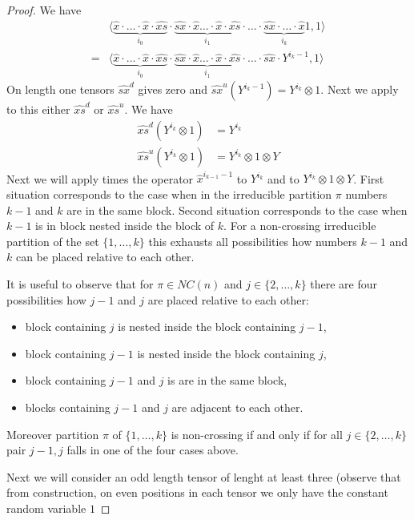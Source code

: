 \documentclass{amsart}
\begin{document}
\begin{proof}
We have
\begin{align*}
	&\langle\underbrace{\widehat{x}\cdot\ldots\cdot \widehat{x} \cdot \widehat{xs}}_{i_0} \cdot \underbrace{\widehat{sx}\cdot \widehat{x}\ldots\cdot \widehat{x} \cdot \widehat{xs}}_{i_1}\cdot\ldots\cdot \underbrace{\widehat{sx}\cdot\ldots\cdot \widehat{x} }_{i_k} 1,1\rangle\\
	=&\langle\underbrace{\widehat{x}\cdot\ldots\cdot \widehat{x} \cdot \widehat{xs}}_{i_0} \cdot \underbrace{\widehat{sx}\cdot \widehat{x}\ldots\cdot \widehat{x} \cdot \widehat{xs}}_{i_1}\cdot\ldots\cdot \widehat{sx} \cdot Y^{i_{k}-1} ,1\rangle
\end{align*}
On length one tensors $\widehat{sx}^d$ gives zero and $\widehat{sx}^u \left(Y^{i_{k}-1}\right)=Y^{i_k}\otimes 1$. Next we apply to this either $\widehat{xs}^d$ or $\widehat{xs}^u$. We have
\begin{align*}
	\widehat{xs}^d(Y^{i_k}\otimes 1)&=Y^{i_k}\\
	\widehat{xs}^u(Y^{i_k}\otimes 1)&=Y^{i_k}\otimes 1\otimes Y
\end{align*}
Next we will apply  times the operator
 $\widehat{x}^{i_{k-1}-1}$
  to $Y^{i_k}$ and to $Y^{i_k}\otimes 1\otimes Y$. First situation corresponds to the case when in the irreducible partition $\pi$ numbers $k-1$ and $k$ are in the same block. Second situation corresponds to the case when $k-1$ is in block nested inside the block of $k$. For a non-crossing irreducible partition of the set $\{1,\ldots,k\}$ this exhausts all possibilities how numbers $k-1$ and $k$ can be placed relative to each other.

It is useful to observe that for $\pi\in NC(n)$ and $j\in\{2,\ldots,k\}$ there are four possibilities how $j-1$ and $j$ are placed relative to each other: 
\begin{itemize}
	\item[$1^o$] block containing $j$ is nested inside the block containing $j-1$,
	\item[$2^o$]  block containing $j-1$ is nested inside the block containing $j$,
	\item[$3^o$]  block containing $j-1$ and $j$ is are in the same block,
	\item[$4^o$] blocks containing $j-1$ and $j$ are adjacent to each other.
\end{itemize}
Moreover partition $\pi$ of $\{1,\ldots,k\}$ is non-crossing if and only if for all $j\in\{2,\ldots,k\}$ pair $j-1,j$ falls in one of the four cases above.

Next we will consider an odd length tensor of lenght at least three (observe that from construction, on even positions in each tensor we only have the constant random variable $1$


\end{proof}
\end{document}
